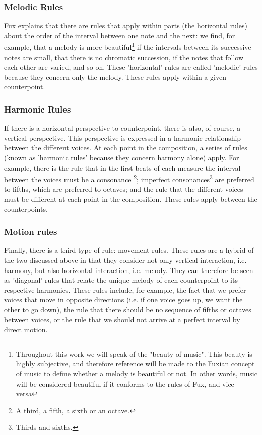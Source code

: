 \subsubsection{Melodic Rules}

Fux explains that there are rules that apply within parts (the horizontal rules) about the order of the interval between one note and the next: we find, for example, that a melody is more beautiful\footnote{Throughout this work we will speak of the "beauty of music". This beauty is highly subjective, and therefore reference will be made to the Fuxian concept of music to define whether a melody is beautiful or not. In other words, music will be considered beautiful if it conforms to the rules of Fux, and vice versa} if the intervals between its successive notes are small, that there is no chromatic succession, if the notes that follow each other are varied, and so on. These 'horizontal' rules are called 'melodic' rules because they concern only the melody. These rules apply within a given counterpoint.


\subsubsection{Harmonic Rules}


If there is a horizontal perspective to counterpoint, there is also, of course, a vertical perspective. This perspective is expressed in a harmonic relationship between the different voices. At each point in the composition, a series of rules (known as 'harmonic rules' because they concern harmony alone) apply. For example, there is the rule that in the first beats of each measure the interval between the voices must be a consonance \footnote{A third, a fifth, a sixth or an octave.}; imperfect consonances\footnote{Thirds and sixths.} are preferred to fifths, which are preferred to octaves; and the rule that the different voices must be different at each point in the composition. These rules apply between the counterpoints.

\subsubsection{Motion rules}
Finally, there is a third type of rule: movement rules. These rules are a hybrid of the two discussed above in that they consider not only vertical interaction, i.e. harmony, but also horizontal interaction, i.e. melody. They can therefore be seen as 'diagonal' rules that relate the unique melody of each counterpoint to its respective harmonies. These rules include, for example, the fact that we prefer voices that move in opposite directions (i.e. if one voice goes up, we want the other to go down), the rule that there should be no sequence of fifths or octaves between voices, or the rule that we should not arrive at a perfect interval by direct motion.

